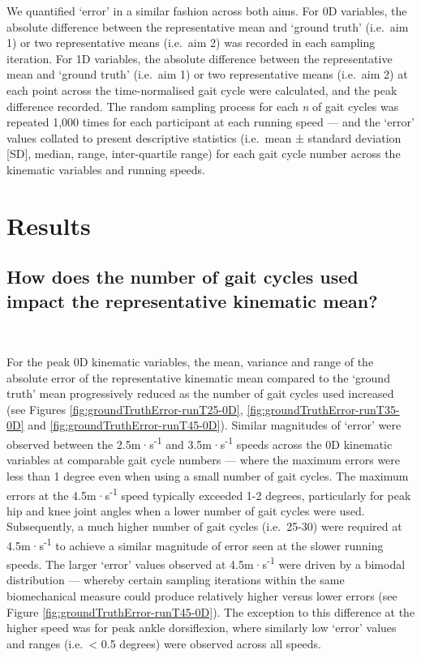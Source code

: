 \documentclass[]{elsarticle} %
\begin{document}
We quantified `error' in a similar fashion across both aims. For 0D
variables, the absolute difference between the representative mean and
`ground truth' (i.e.~aim 1) or two representative means (i.e.~aim 2) was
recorded in each sampling iteration. For 1D variables, the absolute
difference between the representative mean and `ground truth' (i.e.~aim
1) or two representative means (i.e.~aim 2) at each point across the
time-normalised gait cycle were calculated, and the peak difference
recorded. The random sampling process for each \emph{n} of gait cycles
was repeated 1,000 times for each participant at each running speed ---
and the `error' values collated to present descriptive statistics
(i.e.~mean ± standard deviation {[}SD{]}, median, range, inter-quartile
range) for each gait cycle number across the kinematic variables and
running speeds.

\newpage

\hypertarget{results}{%
\section{Results}\label{results}}

\hypertarget{how-does-the-number-of-gait-cycles-used-impact-the-representative-kinematic-mean}{%
\subsection{How does the number of gait cycles used impact the
representative kinematic
mean?}\label{how-does-the-number-of-gait-cycles-used-impact-the-representative-kinematic-mean}}

~

For the peak 0D kinematic variables, the mean, variance and range of the
absolute error of the representative kinematic mean compared to the
`ground truth' mean progressively reduced as the number of gait cycles
used increased (see Figures \ref{fig:groundTruthError-runT25-0D},
\ref{fig:groundTruthError-runT35-0D} and
\ref{fig:groundTruthError-runT45-0D}). Similar magnitudes of `error'
were observed between the 2.5m·s\textsuperscript{-1} and
3.5m·s\textsuperscript{-1} speeds across the 0D kinematic variables at
comparable gait cycle numbers --- where the maximum errors were less
than 1 degree even when using a small number of gait cycles. The maximum
errors at the 4.5m·s\textsuperscript{-1} speed typically exceeded 1-2
degrees, particularly for peak hip and knee joint angles when a lower
number of gait cycles were used. Subsequently, a much higher number of
gait cycles (i.e.~25-30) were required at 4.5m·s\textsuperscript{-1} to
achieve a similar magnitude of error seen at the slower running speeds.
The larger `error' values observed at 4.5m·s\textsuperscript{-1} were
driven by a bimodal distribution --- whereby certain sampling iterations
within the same biomechanical measure could produce relatively higher
versus lower errors (see Figure \ref{fig:groundTruthError-runT45-0D}).
The exception to this difference at the higher speed was for peak ankle
dorsiflexion, where similarly low `error' values and ranges
(i.e.~\textless{} 0.5 degrees) were observed across all speeds.
\end{document}
